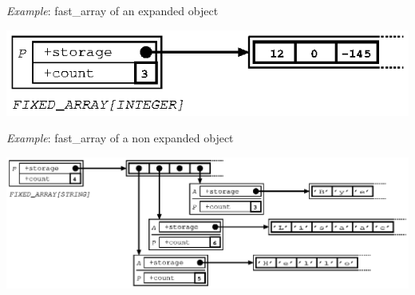 \documentclass[11pt]{mybook}
\begin{document}
{\it{}Example}: {\sc{}fast\_array} of an expanded object
\begin{center}
\includegraphics[scale=1.0]{figures/fixed_array1}
\end{center}

{\it{}Example}: {\sc{}fast\_array} of a non expanded object
\begin{center}
\includegraphics[scale=1.0]{figures/fixed_array2}
\end{center}
\end{document}
